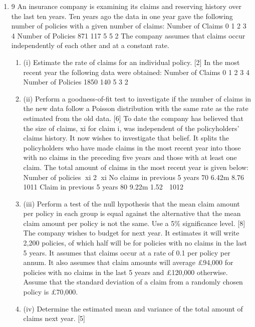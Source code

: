 \documentclass[a4paper,12pt]{article}
\begin{document}
\begin{enumerate}

\item 9 An insurance company is examining its claims and reserving history over the last ten years. Ten years ago the data in one year gave the following number of policies with a given
number of claims:
  Number of Claims 0 1 2 3 4
Number of Policies 871 117 5 5 2
The company assumes that claims occur independently of each other and at a constant rate.
\begin{enumerate}
\item (i) Estimate the rate of claims for an individual policy. [2]
In the most recent year the following data were obtained:
  Number of Claims 0 1 2 3 4
Number of Policies 1850 140 5 3 2
\item (ii) Perform a goodness-of-fit test to investigate if the number of claims in the new data follow a Poisson distribution with the same rate as the rate estimated from the old data. [6]
To date the company has believed that the size of claims, xi for claim i, was independent of the policyholders’ claims history. It now wishes to investigate that belief. It splits the policyholders who have made claims in the most recent year into
those with no claims in the preceding five years and those with at least one claim.
The total amount of claims in the most recent year is given below:
  Number of policies xi 2
xi
No claims in previous 5 years 70 6.42m 8.76  1011
Claim in previous 5 years 80 9.22m 1.52  1012
\item (iii) Perform a test of the null hypothesis that the mean claim amount per policy in each group is equal against the alternative that the mean claim amount per
policy is not the same. Use a 5\% significance level. [8]
The company wishes to budget for next year. It estimates it will write 2,200 policies, of which half will be for policies with no claims in the last 5 years. It assumes that claims occur at a rate of 0.1 per policy per annum. It also assumes that claim amounts
will average £94,000 for policies with no claims in the last 5 years and £120,000 otherwise. Assume that the standard deviation of a claim from a randomly chosen policy is £70,000.
\item (iv) Determine the estimated mean and variance of the total amount of claims next year. [5]
\end{enumerate}


\end{enumerate}
\end{document}
